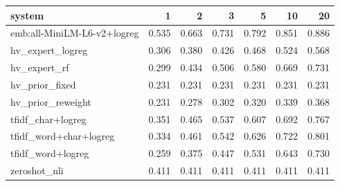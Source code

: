 \begin{tabular}{lrrrrrr}
\toprule
system & 1 & 2 & 3 & 5 & 10 & 20 \\
\midrule
emb:all-MiniLM-L6-v2+logreg & 0.535 & 0.663 & 0.731 & 0.792 & 0.851 & 0.886 \\
hv\_expert\_logreg & 0.306 & 0.380 & 0.426 & 0.468 & 0.524 & 0.568 \\
hv\_expert\_rf & 0.299 & 0.434 & 0.506 & 0.580 & 0.669 & 0.731 \\
hv\_prior\_fixed & 0.231 & 0.231 & 0.231 & 0.231 & 0.231 & 0.231 \\
hv\_prior\_reweight & 0.231 & 0.278 & 0.302 & 0.320 & 0.339 & 0.368 \\
tfidf\_char+logreg & 0.351 & 0.465 & 0.537 & 0.607 & 0.692 & 0.767 \\
tfidf\_word+char+logreg & 0.334 & 0.461 & 0.542 & 0.626 & 0.722 & 0.801 \\
tfidf\_word+logreg & 0.259 & 0.375 & 0.447 & 0.531 & 0.643 & 0.730 \\
zeroshot\_nli & 0.411 & 0.411 & 0.411 & 0.411 & 0.411 & 0.411 \\
\bottomrule
\end{tabular}
